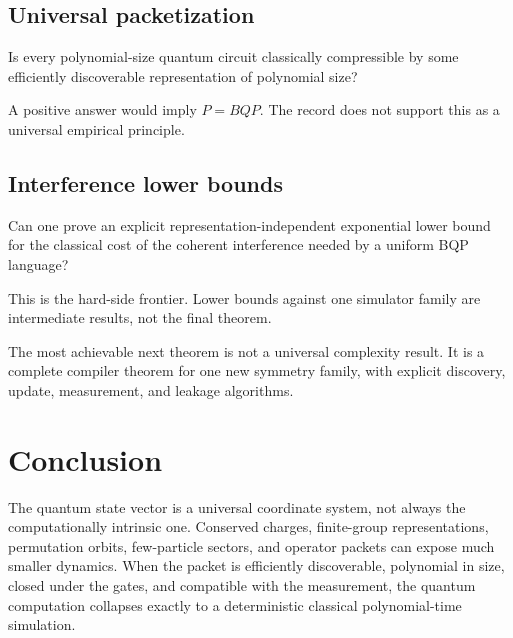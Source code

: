 \subsection{Universal packetization}
\begin{question}
Is every polynomial-size quantum circuit classically compressible by some efficiently discoverable representation of polynomial size?
\end{question}
A positive answer would imply $P=BQP$. The record does not support this as a universal empirical principle.

\subsection{Interference lower bounds}
\begin{question}
Can one prove an explicit representation-independent exponential lower bound for the classical cost of the coherent interference needed by a uniform BQP language?
\end{question}
This is the hard-side frontier. Lower bounds against one simulator family are intermediate results, not the final theorem.

\begin{frontierbox}
The most achievable next theorem is not a universal complexity result. It is a complete compiler theorem for one new symmetry family, with explicit discovery, update, measurement, and leakage algorithms.
\end{frontierbox}

\section{Conclusion}
The quantum state vector is a universal coordinate system, not always the computationally intrinsic one. Conserved charges, finite-group representations, permutation orbits, few-particle sectors, and operator packets can expose much smaller dynamics. When the packet is efficiently discoverable, polynomial in size, closed under the gates, and compatible with the measurement, the quantum computation collapses exactly to a deterministic classical polynomial-time simulation.

